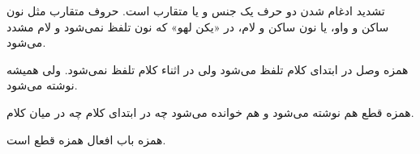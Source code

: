\documentclass{article}
\begin{document}
\begin{addpage}{3}
    \vspace*{6cm}
    \begin{note}
      تشدید ادغام شدن دو حرف یک جنس و یا متقارب است. حروف متقارب مثل نون ساکن و واو، یا نون ساکن و لام، در «یکن لهو» که نون تلفظ نمی‌شود و لام مشدد می‌شود.
    \end{note}
    \begin{note}
      همزه وصل در ابتدای کلام تلفظ می‌شود ولی در اثناء کلام تلفظ نمی‌شود. ولی همیشه نوشته می‌شود.
    \end{note}
    \begin{note}
      همزه قطع هم نوشته می‌شود و هم خوانده می‌شود چه در ابتدای کلام چه در میان کلام.
    \end{note}
    \begin{note}
      همزه باب افعال همزه قطع است.
    \end{note}
\end{addpage}
\end{document}
